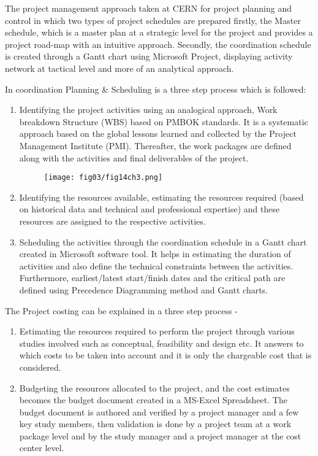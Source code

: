 The project management approach taken at CERN for project planning and control in which two types of project schedules are prepared firstly, the Master schedule, which is a master plan at a strategic level for the project and provides a project road-map with an intuitive approach. Secondly, the coordination schedule is created through a Gantt chart using Microsoft Project, displaying activity network at tactical level and more of an analytical approach.

In coordination Planning \& Scheduling is a three step process which is followed:
 
\begin{enumerate}
	\item Identifying the project activities using an analogical approach, Work breakdown Structure (WBS) based on PMBOK standards. It is a systematic approach based on the global lessons learned and collected by the Project Management Institute (PMI). Thereafter, the work packages are defined along with the activities and final deliverables of the project.
	
	\begin{figure}
		\centering
		\texttt{[image: fig03/fig14ch3.png]}
	\end{figure}

\item Identifying the resources available, estimating the resources required (based on historical data and technical and professional expertise) and these resources are assigned to the respective activities. 

\item  Scheduling the activities through the coordination schedule in a Gantt chart created in Microsoft software tool. It helps in estimating the duration of activities and also define the technical constraints between the activities. Furthermore, earliest/latest start/finish dates and the critical path are defined using Precedence Diagramming method and Gantt charts.

\end{enumerate}
\vspace{1cm}

The Project costing can be explained in a three step process - 

\begin{enumerate}
	\item Estimating the resources required to perform the project through various studies involved such as conceptual, feasibility and design etc. It answers to which costs to be taken into account and it is only  the chargeable cost that is considered. 
	
	\item Budgeting the resources allocated to the project, and the cost estimates becomes the budget document created in a MS-Excel Spreadsheet. The budget document is authored and verified by a project manager and a few key study members, then validation is done by a project team at a work package level and by the study manager and a project manager at the cost center level.
\end{enumerate}

